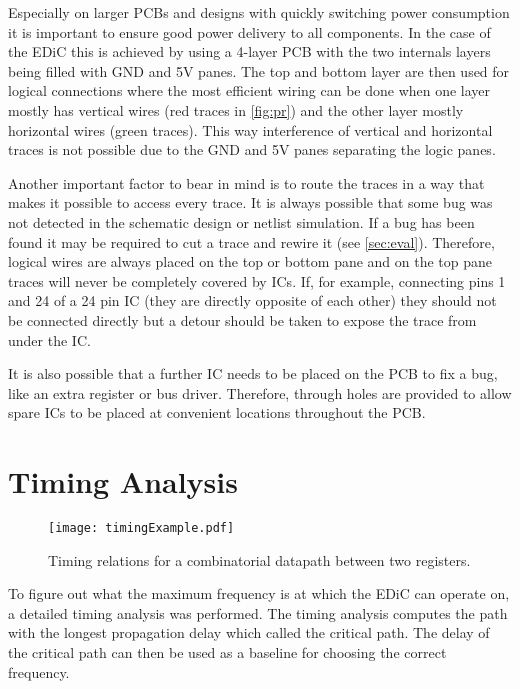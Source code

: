 Especially on larger \glspl{PCB} and designs with quickly switching power consumption it is important to ensure good power delivery to all components.
In the case of the \gls{EDiC} this is achieved by using a 4-layer \gls{PCB} with the two internals layers being filled with GND and 5V panes.
The top and bottom layer are then used for logical connections where the most efficient wiring can be done when one layer mostly has vertical wires (red traces in \cref{fig:pr}) and the other layer mostly horizontal wires (green traces).
This way interference of vertical and horizontal traces is not possible due to the GND and 5V panes separating the logic panes.

Another important factor to bear in mind is to route the traces in a way that makes it possible to access every trace.
It is always possible that some bug was not detected in the schematic design or netlist simulation.
If a bug has been found it may be required to cut a trace and rewire it (see \cref{sec:eval}).
Therefore, logical wires are always placed on the top or bottom pane and on the top pane traces will never be completely covered by \glspl{IC}.
If, for example, connecting pins 1 and 24 of a 24 pin \gls{IC} (they are directly opposite of each other) they should not be connected directly but a detour should be taken to expose the trace from under the \gls{IC}.

It is also possible that a further \gls{IC} needs to be placed on the \gls{PCB} to fix a bug, like an extra register or bus driver.
Therefore, through holes are provided to allow spare \glspl{IC} to be placed at convenient locations throughout the \gls{PCB}.

\section{Timing Analysis}\label{sec:timing}
\begin{figure}[t]
  \centering
  \texttt{[image: timingExample.pdf]}
  \caption{Timing relations for a combinatorial datapath between two registers.}
  \label{fig:timingExample}
\end{figure}
To figure out what the maximum frequency is at which the \gls{EDiC} can operate on, a detailed timing analysis was performed.
The timing analysis computes the path with the longest propagation delay which called the critical path.
The delay of the critical path can then be used as a baseline for choosing the correct frequency.

